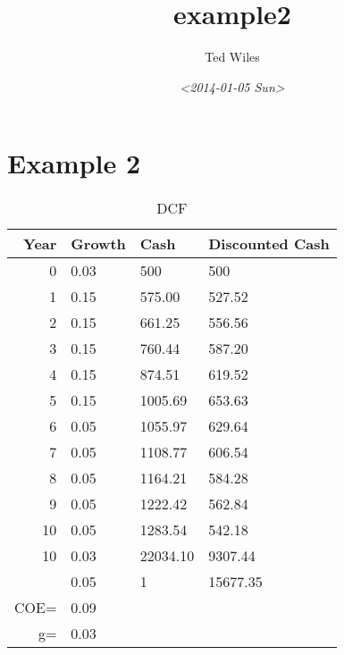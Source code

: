 \documentclass{article}
\author{Ted Wiles}
\date{\textit{<2014-01-05 Sun>}}
\title{example2}
\begin{document}
\maketitle

\section{Example 2}
\label{sec-1}

\begin{table}[htb]
\caption{\label{DCF}DCF}
\begin{tabular}{rlll}
Year & Growth \footnotemark & Cash & Discounted Cash\\
\hline
0 & 0.03 & 500 & 500\\
1 & 0.15 \footnotemark & 575.00 \footnotemark & 527.52 \footnotemark\\
2 & 0.15 \footnotemark[2]{} & 661.25 \footnotemark[3]{} & 556.56 \footnotemark[4]{}\\
3 & 0.15 \footnotemark[2]{} & 760.44 \footnotemark[3]{} & 587.20 \footnotemark[4]{}\\
4 & 0.15 \footnotemark[2]{} & 874.51 \footnotemark[3]{} & 619.52 \footnotemark[4]{}\\
5 & 0.15 \footnotemark[2]{} & 1005.69 \footnotemark[3]{} & 653.63 \footnotemark[4]{}\\
6 & 0.05 \footnotemark & 1055.97 \footnotemark[3]{} & 629.64 \footnotemark[4]{}\\
7 & 0.05 \footnotemark[5]{} & 1108.77 \footnotemark[3]{} & 606.54 \footnotemark[4]{}\\
8 & 0.05 \footnotemark[5]{} & 1164.21 \footnotemark[3]{} & 584.28 \footnotemark[4]{}\\
9 & 0.05 \footnotemark[5]{} & 1222.42 \footnotemark[3]{} & 562.84 \footnotemark[4]{}\\
10 & 0.05 \footnotemark[5]{} & 1283.54 \footnotemark[3]{} & 542.18 \footnotemark[4]{}\\
10 & 0.03 & 22034.10 \footnotemark & 9307.44 \footnotemark[4]{}\\
 & 0.05 & 1 \footnotemark & 15677.35 \footnotemark\\
\hline
COE= & 0.09 \footnotemark &  & \\
g= & 0.03 \footnotemark[1]{} &  & \\
\end{tabular}
\end{table}
\end{document}
